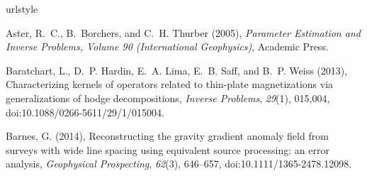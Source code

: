 \documentclass[draft,gc]{agutex}
\providecommand{\DIFaddbegin}{} %
\providecommand{\DIFaddend}{} %
\providecommand{\DIFdelbegin}{} %
\providecommand{\DIFdelend}{} %
\begin{document}
\begin{article}
%
%
%

%
%


%
%
%

\DIFdelbegin %
\DIFdelend \DIFaddbegin \begin{thebibliography}{56}
\DIFaddend \providecommand{\natexlab}[1]{#1}
\expandafter\ifx\csname urlstyle\endcsname\relax
  \providecommand{\doi}[1]{doi:\discretionary{}{}{}#1}\else
  \providecommand{\doi}{doi:\discretionary{}{}{}\begingroup
  \urlstyle{rm}\Url}\fi

Aster, R.~C., B.~Borchers, and C.~H. Thurber (2005), \textit{Parameter
  Estimation and Inverse Problems, Volume 90 (International Geophysics)},
  Academic Press.

Baratchart, L., D.~P. Hardin, E.~A. Lima, E.~B. Saff, and B.~P. Weiss (2013),
  Characterizing kernels of operators related to thin-plate magnetizations via
  generalizations of hodge decompositions, \textit{Inverse Problems},
  \textit{29}(1), 015,004, \doi{10.1088/0266-5611/29/1/015004}.

Barnes, G. (2014), Reconstructing the gravity gradient anomaly field from
  surveys with wide line spacing using equivalent source processing: an error
  analysis, \textit{Geophysical Prospecting}, \textit{62}(3), 646--657,
  \doi{10.1111/1365-2478.12098}.


\end{thebibliography}
\end{article}
\end{document}
